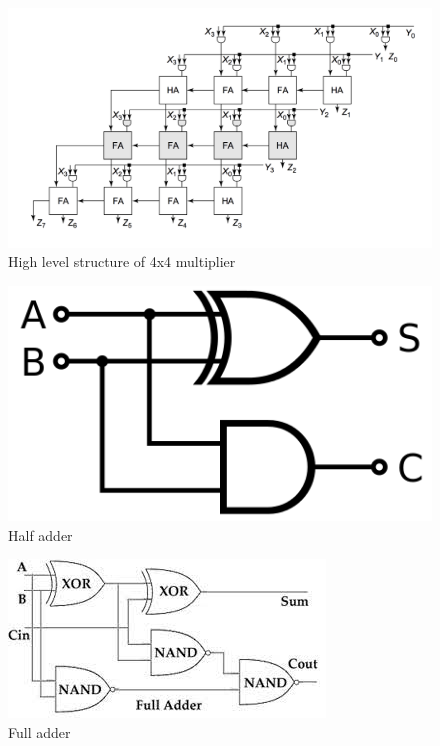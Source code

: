 \documentclass[conference]{IEEEtran}
\begin{document}
\begin{figure}[h]
    \centering
    \includegraphics[width=0.9\linewidth]{4x4_multiplier.png}
    \caption{High level structure of 4x4 multiplier}
    \label{High level structure of 4x4 multiplier}
\end{figure} 

\begin{figure}[h]
    \centering
    \includegraphics[width=0.45\linewidth]{half_adder.png}
    \caption{Half adder}
    \label{Half adder}
\end{figure}

\begin{figure}[h]
    \centering
    \includegraphics[width=0.6\linewidth]{full_adder.jpeg}
    \caption{Full adder}
    \label{Full adder}
\end{figure}

\end{document}

